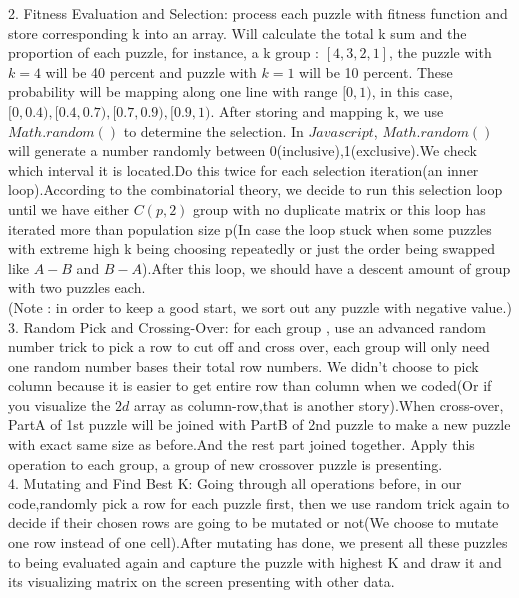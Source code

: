 \documentclass[12pt, letterpaper]{article}
\begin{document}
2. Fitness Evaluation and Selection: process each puzzle with fitness function and store corresponding k into an array. Will calculate the total k sum and the proportion of each puzzle, for instance, a k group : $[4,3,2,1]$, the puzzle with ${k=4}$ will be 40 percent and puzzle with $k=1$ will be 10 percent. These probability will be mapping along one line with range $[0,1)$, in this case,$[0,0.4),[0.4,0.7),[0.7,0.9),[0.9,1)$. After storing and mapping k, we use $Math.random()$ to determine the selection. In $Javascript$, $Math.random()$ will generate a number randomly between 0(inclusive),1(exclusive).We check which interval it is located.Do this twice for each selection iteration(an inner loop).According to the combinatorial theory, we decide to run this selection loop until we have either $C(p,2)$ group with no duplicate matrix or this loop has iterated more than population size p(In case the loop stuck when some puzzles with extreme high k being choosing repeatedly or just the order being swapped like $A-B$ and $B-A$).After this loop, we should have a descent amount of group with two puzzles each.\\

(Note : in order to keep a good start, we sort out any puzzle with negative value.)\\

3. Random Pick and Crossing-Over: for each group , use an advanced random number trick to pick a row to cut off and cross over, each group will only need one random number bases their total row numbers. We didn't choose to pick column because it is easier to get entire row than column when we coded(Or if you visualize the $2d$ array as column-row,that is another story).When cross-over, PartA of 1st puzzle will be joined with PartB of 2nd puzzle to make a new puzzle with exact same size as before.And the rest part joined together. Apply this operation to each group, a group of new crossover puzzle is presenting.\\

4. Mutating and Find Best K: Going through all operations before, in our code,randomly pick a row for each puzzle first, then we use random trick again to decide if their chosen rows are going to be mutated or not(We choose to mutate one row instead of one cell).After mutating has done, we present all these puzzles to being evaluated again and capture the puzzle with highest K and draw it and its visualizing matrix on the screen presenting with other data.\\
\end{document}
